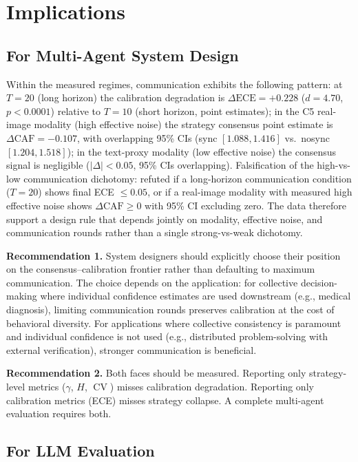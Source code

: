 \documentclass[11pt]{article}
\DeclareMathOperator{\CV}{CV}
\begin{document}
\section{Implications}

\subsection{For Multi-Agent System Design}

Within the measured regimes, communication exhibits the following pattern: at $T = 20$ (long horizon) the calibration degradation is $\Delta\text{ECE} = +0.228$ ($d = 4.70$, $p < 0.0001$) relative to $T = 10$ (short horizon, point estimates); in the C5 real-image modality (high effective noise) the strategy consensus point estimate is $\Delta\text{CAF} = -0.107$, with overlapping 95\% CIs (sync $[1.088, 1.416]$ vs.\ nosync $[1.204, 1.518]$); in the text-proxy modality (low effective noise) the consensus signal is negligible ($|\Delta| < 0.05$, 95\% CIs overlapping). Falsification of the high-vs-low communication dichotomy: refuted if a long-horizon communication condition ($T = 20$) shows final ECE $\leq 0.05$, or if a real-image modality with measured high effective noise shows $\Delta\text{CAF} \geq 0$ with 95\% CI excluding zero. The data therefore support a design rule that depends jointly on modality, effective noise, and communication rounds rather than a single strong-vs-weak dichotomy.

\textbf{Recommendation 1.} System designers should explicitly choose their position on the consensus--calibration frontier rather than defaulting to maximum communication. The choice depends on the application: for collective decision-making where individual confidence estimates are used downstream (e.g., medical diagnosis), limiting communication rounds preserves calibration at the cost of behavioral diversity. For applications where collective consistency is paramount and individual confidence is not used (e.g., distributed problem-solving with external verification), stronger communication is beneficial.

\textbf{Recommendation 2.} Both faces should be measured. Reporting only strategy-level metrics ($\gamma$, $H$, $\CV$) misses calibration degradation. Reporting only calibration metrics (ECE) misses strategy collapse. A complete multi-agent evaluation requires both.

\subsection{For LLM Evaluation}
\end{document}

